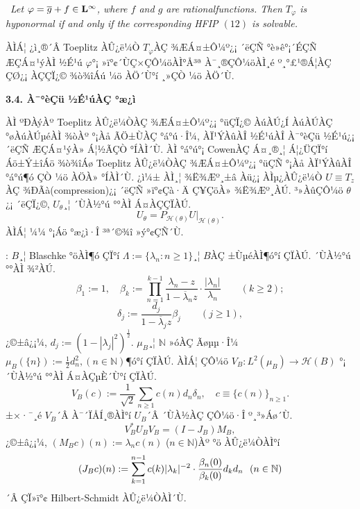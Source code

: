 \documentclass[12pt,a4paper,2sided]{article}
\begin{document}
\ {\sl Let $\varphi=\overline{g}+f\in
\bold L^\infty$, where $f$ and $g$ are rational\linebreak functions.
Then $T_\varphi$ is hyponormal if and only if the corresponding HFIP
$(12)$ is solvable.}


\vspace{0.2cm} ÀÌÁ¦ ¿ì¸®´Â Toeplitz ÀÛ¿ë¼Ò $T_\varphi$ÀÇ ¾ÆÁ¤±Ô¼º¿¡
´ëÇÑ °è»ê°¡´ÉÇÑ ÆÇÁ¤¹ýÀÌ ½É¹ú $\varphi$°¡ »ï°¢´ÙÇ×ÇÔ¼öÀÌ°Å³ª
À¯¸®ÇÔ¼öÀÌ¸é º¸°£¹®Á¦ÀÇ ÇØ¿¡ ÀÇÇÏ¿© ¾ò¾îÁú ¼ö ÀÖ´Ù°í ¸»ÇÒ ¼ö ÀÖ´Ù.

\newpage{}

\vspace{0.8cm}

{\bf 3.4. À¯°èÇü ½É¹úÀÇ °æ¿ì}

\vspace{0.3cm}

ÀÌ ºÐÀýÀº Toeplitz ÀÛ¿ë¼ÒÀÇ ¾ÆÁ¤±Ô¼º¿¡ °üÇÏ¿© ÀúÀÚ¿Í ÀúÀÚÀÇ
°øÀúÀÚµéÀÌ ¾òÀº °¡Àå ÃÖ±ÙÀÇ °á°ú·Î¼­, ÀÏ¹ÝÀûÀÎ ½É¹úÀÎ À¯°èÇü ½É¹ú¿¡
´ëÇÑ ÆÇÁ¤¹ýÀ» Á¦½ÃÇÒ °ÍÀÌ´Ù. ÀÌ °á°ú°¡ CowenÀÇ Á¤¸®¸¦ Á¦¿ÜÇÏ°í
Áö±Ý±îÁö ¾ò¾îÁø Toeplitz ÀÛ¿ë¼ÒÀÇ ¾ÆÁ¤±Ô¼º¿¡ °üÇÑ °¡Àå ÀÏ¹ÝÀûÀÎ
°á°ú¶ó ÇÒ ¼ö ÀÖÀ» °ÍÀÌ´Ù. ¿ì¼± ÀÌ¸¦ ¾Ë¾Æº¸±â Àü¿¡ ÀÌµ¿ÀÛ¿ë¼Ò $U
\equiv T_z$ÀÇ ¾ÐÃà(compression)¿¡ ´ëÇÑ »ï°¢Çà·Ä Ç¥ÇöÀ» ¾Ë¾Æº¸ÀÚ.
³»ÀûÇÔ¼ö $\theta$¿¡ ´ëÇÏ¿©, $U_\theta$¸¦ ´ÙÀ½°ú °°ÀÌ Á¤ÀÇÇÏÀÚ.
\begin{equation}\label{3.1}
U_\theta= P_{\mathcal H (\theta)} U \vert_{\mathcal H (\theta)}.
\end{equation}
ÀÌÁ¦ ¼¼ °¡Áö °æ¿ì·Î ³ª´©¾î »ý°¢ÇÑ´Ù.

\vspace{0.3cm}

 : $B$¸¦ Blaschke °öÀÌ¶ó ÇÏ°í
$\Lambda:=\{\lambda_n : n \geq 1\}$¸¦ $B$ÀÇ ±ÙµéÀÌ¶ó°í ÇÏÀÚ. ´ÙÀ½°ú
°°ÀÌ ¾²ÀÚ.
$$
\beta_1:=1, \quad
\beta_k:=\prod_{n=1}^{k-1}\frac{\lambda_n-z}{1-\overline{\lambda}_n z}\cdot
\frac{|\lambda_n|}{\lambda_n}\qquad (k\geq 2);
$$
$$
\delta_j\label{deltaj}:=\frac{d_j}{1-\overline{\lambda}_j z}\beta_j \qquad (j \geq
1),
$$
¿©±â¿¡¼­, $d_j\label{dj}:=(1-|\lambda_j|^2)^{\frac{1}{2}}$.
$\mu_B\label{mub}$¸¦ $\mathbb N$ »óÀÇ Ãøµµ·Î¼­
$\mu_B(\{n\}):=\frac{1}{2}d_n^2, (n \in \mathbb N)$¶ó°í ÇÏÀÚ. ÀÌÁ¦
ÇÔ¼ö  $V_B\label{VB}: L^2(\mu_B)\to \mathcal H(B)$ °¡ ´ÙÀ½°ú °°ÀÌ
Á¤ÀÇµÈ´Ù°í ÇÏÀÚ.
\begin{equation}\label{3.2}
V_B(c):=\frac{1}{\sqrt{2}} \sum_{n \geq 1} c(n)d_n \delta_n, \quad c
\equiv \{c(n)\}_{n \geq 1}.
\end{equation}
±×·¯¸é $V_B$´Â À¯´ÏÅÍ¸®ÀÌ°í $U_B$´Â ´ÙÀ½ÀÇ ÇÔ¼ö·Î º¸³»Áø´Ù.
\begin{equation}\label{3.3}
V_B^*U_B V_B=(I-J_B)M_B,
\end{equation}
¿©±â¿¡¼­, $(M_B\label{MB} c)(n):=\lambda_n c(n)$ ($n\in \mathbb
N$)Àº °ö ÀÛ¿ë¼ÒÀÌ°í
$$
(J_B\label{JB} c)(n):=\sum_{k=1}^{n-1}c(k)|\lambda_k|^{-2} \cdot
\frac{\beta_n(0)}{\beta_k(0)}d_k d_n \ \ \hbox{$(n \in \mathbb N$)}
$$
´Â ÇÏ»ï°¢ Hilbert-Schmidt ÀÛ¿ë¼ÒÀÌ´Ù. \
\end{document}
